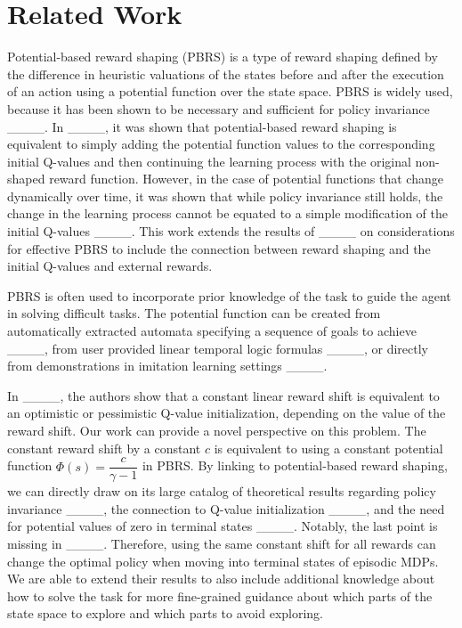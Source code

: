 \section{Related Work}
Potential-based reward shaping (PBRS) is a type of reward shaping defined by the difference in heuristic valuations of the states before and after the execution of an action using a potential function over the state space. PBRS is widely used, because it has been shown to be necessary and sufficient for policy invariance ____. 
In ____, it was shown that potential-based reward shaping is equivalent to simply adding the potential function values to the corresponding initial Q-values and then continuing the learning process with the original non-shaped reward function. However, in the case of potential functions that change dynamically over time, it was shown that while policy invariance still holds, the change in the learning process cannot be equated to a simple modification of the initial Q-values ____.
This work extends the results of ____ on considerations for effective PBRS to include the connection between reward shaping and the initial Q-values and external rewards.

PBRS is often used to incorporate prior knowledge of the task to guide the agent in solving difficult tasks. The potential function can be created from automatically extracted automata specifying a sequence of goals to achieve ____, from user provided linear temporal logic formulas ____, or directly from demonstrations in imitation learning settings ____.

In ____, the authors show that a constant linear reward shift is equivalent to an optimistic or pessimistic Q-value initialization, depending on the value of the reward shift. Our work can provide a novel perspective on this problem. The constant reward shift by a constant $c$ is equivalent to using a constant potential function $\Phi(s)= \dfrac{c}{\gamma - 1}$ in PBRS. By linking to potential-based reward shaping, we can directly draw on its large catalog of theoretical results regarding policy invariance ____, the connection to Q-value initialization ____, and the need for potential values of zero in terminal states ____. Notably, the last point is missing in ____. 
Therefore, using the same constant shift for all rewards can change the optimal policy when moving into terminal states of episodic MDPs. We are able to extend their results to also include additional knowledge about how to solve the task for more fine-grained guidance about which parts of the state space to explore and which parts to avoid exploring.

